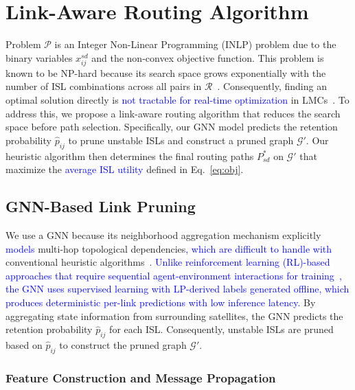 \section{Link-Aware Routing Algorithm}
\label{sec:proposed_scheme}

Problem $\mathcal{P}$ is an Integer Non-Linear Programming (INLP) problem due to the binary variables $x_{ij}^{sd}$ and the non-convex objective function. This problem is known to be NP-hard because its search space grows exponentially with the number of ISL combinations across all pairs in $\mathcal{R}$~\cite{guo2024lightweight}. Consequently, finding an optimal solution directly is \textcolor{blue}{not tractable for real-time optimization} in LMCs~\cite{huang2026dynamic}. To address this, we propose a link-aware routing algorithm that reduces the search space before path selection. Specifically, our GNN model predicts the retention probability $\hat{p}_{ij}$ to prune unstable ISLs and construct a pruned graph $\mathcal{G}'$. Our heuristic algorithm then determines the final routing paths $P_{sd}^*$ on $\mathcal{G}'$ that maximize the \textcolor{blue}{average ISL utility} defined in Eq.~\eqref{eq:obj}.

\subsection{GNN-Based Link Pruning}
\label{subsec:learning}

We use a GNN because its neighborhood aggregation mechanism explicitly \textcolor{blue}{models} multi-hop topological dependencies\textcolor{blue}{, which are difficult to handle with} conventional heuristic algorithms~\cite{rao2025dynamic}. \textcolor{blue}{Unlike reinforcement learning (RL)-based approaches that require sequential agent-environment interactions for training~\cite{rao2025dynamic}, the GNN uses supervised learning with LP-derived labels generated offline, which produces deterministic per-link predictions with low inference latency.} By aggregating state information from surrounding satellites, the GNN predicts the retention probability $\hat{p}_{ij}$ for each ISL. Consequently, unstable ISLs are pruned based on $\hat{p}_{ij}$ to construct the pruned graph $\mathcal{G}'$.


\subsubsection{Feature Construction and Message Propagation}

